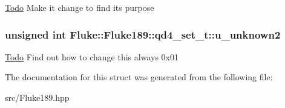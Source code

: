 \label{structFluke_1_1Fluke189_1_1qd4__set__t_aa49bec7dfd9d22c392297cdff277afd9}
\begin{Desc}
\item[\hyperlink{todo__todo000019}{Todo}]Make it change to find its purpose \end{Desc}
\hypertarget{structFluke_1_1Fluke189_1_1qd4__set__t_a7ac5798f6713dc4b811b2388d9374c74}{
\subsubsection[{u\_\-unknown2}]{\setlength{\rightskip}{0pt plus 5cm}unsigned int {\bf Fluke::Fluke189::qd4\_\-set\_\-t::u\_\-unknown2}}}
\label{structFluke_1_1Fluke189_1_1qd4__set__t_a7ac5798f6713dc4b811b2388d9374c74}
\begin{Desc}
\item[\hyperlink{todo__todo000020}{Todo}]Find out how to change this always 0x01 \end{Desc}


The documentation for this struct was generated from the following file:\begin{DoxyCompactItemize}
\item 
src/Fluke189.hpp\end{DoxyCompactItemize}
